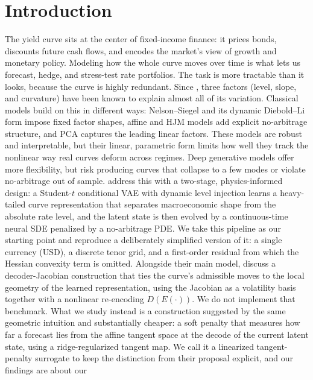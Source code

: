 \documentclass{article} %
\begin{document}
\section{Introduction}
The yield curve sits at the center of fixed-income finance: it prices bonds,
discounts future cash flows, and encodes the market's view of growth and monetary
policy. Modeling how the whole curve moves over time is what lets us forecast,
hedge, and stress-test rate portfolios. The task is more tractable than it looks,
because the curve is highly redundant. Since \citet{LittermanScheinkman1991},
three factors (level, slope, and curvature) have been known to explain almost all
of its variation. Classical models build on this in different ways:
Nelson--Siegel \citep{NelsonSiegel1987} and its dynamic Diebold--Li form
\citep{DieboldLi2006} impose fixed factor shapes, affine and HJM models
\citep{DuffieKan1996, HeathJarrowMorton1992} add explicit no-arbitrage structure,
and PCA captures the leading linear factors. These models are robust and
interpretable, but their linear, parametric form limits how well they track the
nonlinear way real curves deform across regimes.
Deep generative models offer more flexibility, but risk producing curves that
collapse to a few modes or violate no-arbitrage out of sample.
\citet{NoArbVAEYieldCurves} address this with a two-stage, physics-informed design:
a Student-$t$ conditional VAE with dynamic level injection learns a heavy-tailed
curve representation that separates macroeconomic shape from the absolute rate
level, and the latent state is then evolved by a continuous-time neural SDE
penalized by a no-arbitrage PDE. We take this pipeline as our starting point and
reproduce a deliberately simplified version of it: a single currency (USD), a
discrete tenor grid, and a first-order residual from which the Hessian convexity
term is omitted.
Alongside their main model, \citet{NoArbVAEYieldCurves} discuss a decoder-Jacobian
construction that ties the curve's admissible moves to the local geometry of the
learned representation, using the Jacobian as a volatility basis together with a
nonlinear re-encoding $D(E(\cdot))$. We do not implement that benchmark. What we
study instead is a construction suggested by the same geometric intuition and
substantially cheaper: a soft penalty that measures how far a forecast lies from
the affine tangent space at the decode of the current latent state, using a
ridge-regularized tangent map. We call it a linearized tangent-penalty surrogate to
keep the distinction from their proposal explicit, and our findings are about our
\end{document}
